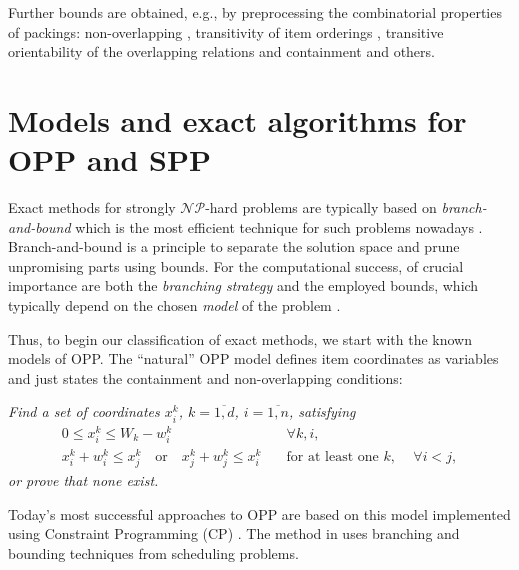 \documentclass[a4paper,12pt]{article}
\begin{document}
Further bounds are obtained, e.g., by preprocessing the combinatorial properties of packings: non-overlapping \cite{ClaConstr}, transitivity of item orderings \cite{PisBPP07}, transitive orientability of the overlapping relations and containment \cite{FekExactLarge} and others.

\section{Models and exact algorithms for OPP and SPP}

Exact methods for strongly $\mathcal{NP}$-hard problems are typically based on \emph{branch-and-bound} which is the most efficient technique for such problems nowadays \cite{NW88}. Branch-and-bound is a principle to separate the solution space and prune unpromising parts using bounds. For the computational success, of crucial importance are both the \emph{branching strategy} and the employed bounds, which typically depend on the chosen \emph{model} of the problem \cite{NW88}.

Thus, to begin our classification of exact methods, we start with the known models of OPP. The ``natural'' OPP model defines item coordinates as variables and just states the containment and non-overlapping conditions:

\emph{Find a set of coordinates $x^k_i$, $k=\overline{1,d}$, $i=\overline{1,n}$, satisfying}
\begin{subequations} \label{modOPP}
\begin{align}
0\le x^k_i \le W_k - w^k_i &  \quad \forall k, i, \label{modOPPcnt} \\
x^k_i + w^k_i \le x^k_j \quad \text{or} \quad x^k_j + w^k_j \le x^k_i &  \quad \text{for at least one $k$, }\quad \forall i < j, \label{modOPPord} %
\end{align}
\end{subequations}
\emph{or prove that none exist.}

Today's most successful approaches to OPP are based on this model implemented using Constraint Programming (CP) \cite{ClaConstr,SimonisSearch,BeldiceanuCP08,PisBPP07}. The method in \cite{ClaConstr} uses branching and bounding techniques from scheduling problems. 
\end{document}
